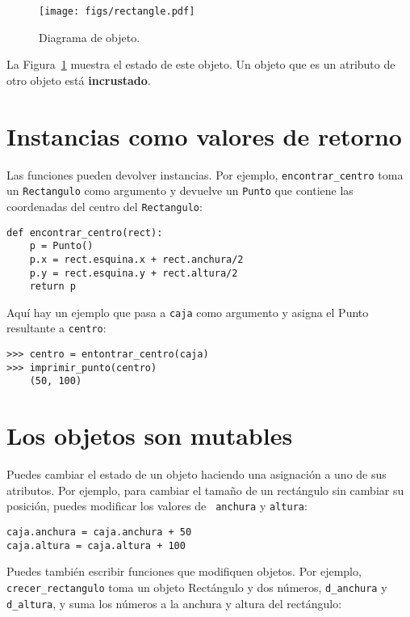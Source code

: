 \documentclass[10pt]{book}
\begin{document}
\begin{figure}
\centerline
{\texttt{[image: figs/rectangle.pdf]}}
\caption{Diagrama de objeto.}
\label{fig.rectangle}
\end{figure}


La Figura~\ref{fig.rectangle} muestra el estado de este objeto.
Un objeto que es un atributo de otro objeto está {\bf incrustado}.


\section{Instancias como valores de retorno}

Las funciones pueden devolver instancias.  Por ejemplo, \verb"encontrar_centro"
toma un {\tt Rectangulo} como argumento y devuelve un {\tt Punto}
que contiene las coordenadas del centro del {\tt Rectangulo}:

\begin{verbatim}
def encontrar_centro(rect):
    p = Punto()
    p.x = rect.esquina.x + rect.anchura/2
    p.y = rect.esquina.y + rect.altura/2
    return p
\end{verbatim}
%
Aquí hay un ejemplo que pasa a {\tt caja} como argumento y asigna
el Punto resultante a {\tt centro}:

\begin{verbatim}
>>> centro = entontrar_centro(caja)
>>> imprimir_punto(centro)
    (50, 100)
\end{verbatim}
%

\section{Los objetos son mutables}

Puedes cambiar el estado de un objeto haciendo una asignación a uno de
sus atributos.  Por ejemplo, para cambiar el tamaño de un rectángulo
sin cambiar su posición, puedes modificar los valores de {\tt
anchura} y {\tt altura}:

\begin{verbatim}
caja.anchura = caja.anchura + 50
caja.altura = caja.altura + 100
\end{verbatim}
%
Puedes también escribir funciones que modifiquen objetos.  Por ejemplo,
\verb"crecer_rectangulo" toma un objeto Rectángulo y dos números,
{\tt d\_anchura} y {\tt d\_altura}, y suma los números a la
anchura y altura del rectángulo:
\end{document}
